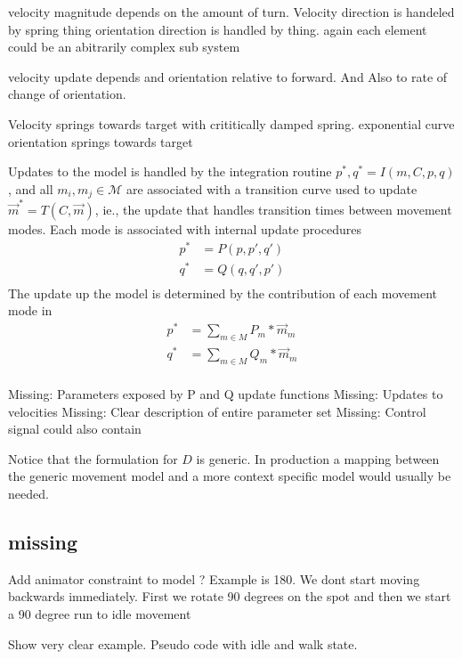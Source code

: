 velocity magnitude depends on the amount of turn.
Velocity direction is handeled by spring thing
orientation direction is handled by thing.
again each element could be an abitrarily complex sub system




velocity update depends and orientation relative to forward. And Also to rate of change of orientation.

Velocity springs towards target with crititically damped spring. exponential curve
orientation springs towards target 

Updates to the model is handled by the integration routine $p^*,q^*=I(m,C,p,q)$, and all $m_i,m_j\in\mathcal{M}$ are associated with a transition curve used to update $\vec{m}^*=T(C,\vec{m})$, ie., the update that handles transition times between movement modes. 
Each mode is associated with internal update procedures
\begin{equation}
\begin{split}
    p^*&=P(p,p',q')\\
    q^*&=Q(q,q',p')\\
\end{split}
\end{equation}
The update up the model is determined by the contribution of each movement mode in 
\begin{equation}
\begin{split}
    p^*&=\sum_{m\in{M}}{P_m*\vec{m}_m}\\
    q^*&=\sum_{m\in{M}}{Q_m*\vec{m}_m}\\
\end{split}
\end{equation}

Missing: Parameters exposed by P and Q update functions
Missing: Updates to velocities
Missing: Clear description of entire parameter set
Missing: Control signal could also contain

Notice that the formulation for $D$ is generic. In production a mapping between the generic movement model and a more context specific model would usually be needed. 

\subsection{missing}
Add animator constraint to model ? Example is 180. We dont start moving backwards immediately. First we rotate 90 degrees on the spot and then we start a 90 degree run to idle movement

Show very clear example. Pseudo code with idle and walk state. 